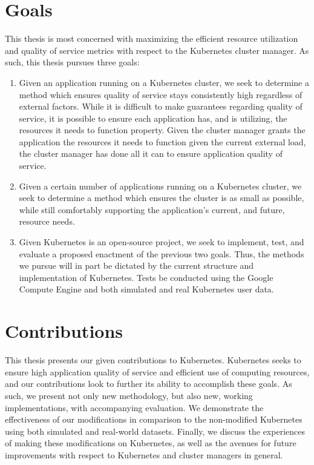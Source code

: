 \documentclass[twoside]{report}
\begin{document}
\section{Goals}

This thesis is most concerned with maximizing the efficient resource utilization
and quality of service metrics with respect to the Kubernetes cluster manager.
As such, this thesis pursues three goals:

\begin{enumerate}
  \item Given an application running on a Kubernetes cluster, we seek to
    determine a method which ensures quality of
    service stays consistently high regardless of external factors. While it is
    difficult to make guarantees regarding quality of service, it is possible to
    ensure each application has, and is utilizing, the resources it needs to
    function property. Given the cluster manager grants the application the
    resources it needs to function given the current external load,
    the cluster manager has done all it can to ensure application quality of
    service.
  \item Given a certain number of applications running on a Kubernetes cluster,
    we seek to determine a method which ensures the cluster is
    as small as possible, while still comfortably
    supporting the application's current, and future, resource needs.
  \item Given Kubernetes is an open-source project, we seek to implement, test, and
    evaluate a proposed enactment of the previous two goals.
    Thus, the methods we pursue will
    in part be dictated by the current structure and implementation of
    Kubernetes. Tests be conducted using the Google Compute
    Engine\cite{google-compute-engine} and both
    simulated and real Kubernetes user data.
\end{enumerate}

\section{Contributions}

This thesis presents our given contributions to Kubernetes. Kubernetes seeks to
ensure high application quality of service and efficient use of computing
resources, and our contributions look to further its ability to accomplish these
goals. As such, we present not only new methodology, but also new, working
implementations, with accompanying evaluation. We demonstrate the effectiveness
of our modifications in comparison to the non-modified Kubernetes using both
simulated and real-world datasets. Finally, we
discuss the experiences of making these modifications on Kubernetes, as well as
the avenues for future improvements with respect to Kubernetes and cluster managers in
general.
\end{document}
